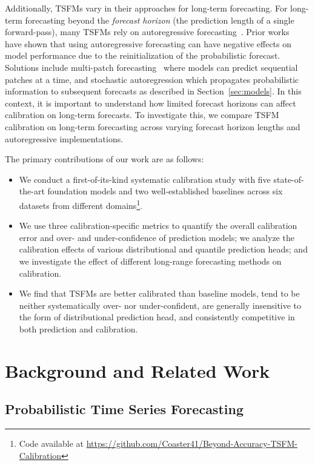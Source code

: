 \documentclass{article}
\begin{document}
Additionally, TSFMs vary in their approaches for long-term forecasting.
For long-term forecasting beyond the \textit{forecast horizon} (the prediction length of a single forward-pass), many TSFMs rely on autoregressive forecasting~\citep{timesfm,chronos-bolt,toto}. %
Prior works~\citep{tirex,yinglong} have shown that using autoregressive forecasting can have negative effects on model performance due to the reinitialization of the probabilistic forecast.
Solutions include multi-patch forecasting~\citep{moirai} where models can predict sequential patches at a time, and stochastic autoregression which propagates probabilistic information to subsequent forecasts as described in Section~\ref{sec:models}. 
In this context, it is important to understand how limited forecast horizons can affect calibration on long-term forecasts.
To investigate this, we compare TSFM calibration on long-term forecasting across varying forecast horizon lengths and autoregressive implementations. 

The primary contributions of our work are as follows:
\begin{itemize}
    \item We conduct a first-of-its-kind systematic calibration study with five state-of-the-art foundation models and two well-established baselines across six datasets from different domains\footnote{Code available at \url{https://github.com/Coaster41/Beyond-Accuracy-TSFM-Calibration}}.
    \item We use three calibration-specific metrics to quantify the overall calibration error and over- and under-confidence of prediction models; we analyze the calibration effects of various distributional and quantile prediction heads; and we investigate the effect of different long-range forecasting methods on calibration. 
    \item We find that TSFMs are better calibrated than baseline models, tend to be neither systematically over- nor under-confident, are generally insensitive to the form of distributional prediction head, and consistently competitive in both prediction and calibration.
\end{itemize}


\section{Background and Related Work}

\subsection{Probabilistic Time Series Forecasting} 
\end{document}
